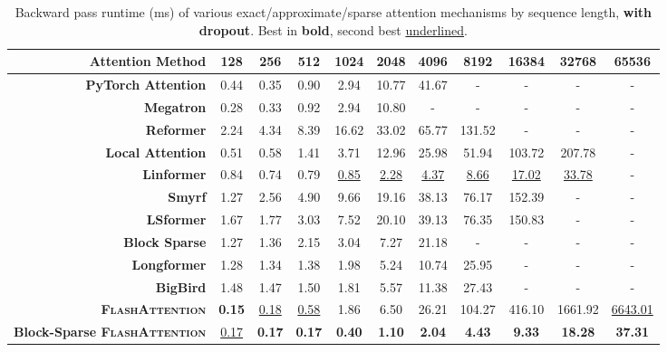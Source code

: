 \documentclass{article}
\newcommand{\sysname}{\textsc{FlashAttention}\xspace}
\begin{document}
\begin{table}
\centering
\scriptsize
\captionsetup{font=small}
\caption{Backward pass runtime (ms) of various exact/approximate/sparse attention mechanisms by sequence length, \textbf{with dropout}. Best in \textbf{bold}, second best \underline{underlined}.}
\begin{tabular}{@{}r|cccccccccc@{}}
\toprule
\textbf{Attention Method} & 128 & 256 & 512 & 1024 & 2048 & 4096 & 8192 & 16384 & 32768 & 65536 \\
\hline
\textbf{PyTorch Attention} & 0.44 & 0.35 & 0.90 & 2.94 & 10.77 & 41.67 & - & - & - & - \\
\textbf{Megatron} & 0.28 & 0.33 & 0.92 & 2.94 & 10.80 & - & - & - & - & - \\
\hline
\textbf{Reformer} & 2.24 & 4.34 & 8.39 & 16.62 & 33.02 & 65.77 & 131.52 & - & - & - \\
\textbf{Local Attention} & 0.51 & 0.58 & 1.41 & 3.71 & 12.96 & 25.98 & 51.94 & 103.72 & 207.78 & - \\
\textbf{Linformer} & 0.84 & 0.74 & 0.79 & \underline{0.85} & \underline{2.28} & \underline{4.37} & \underline{8.66} & \underline{17.02} & \underline{33.78} & - \\
\textbf{Smyrf} & 1.27 & 2.56 & 4.90 & 9.66 & 19.16 & 38.13 & 76.17 & 152.39 & - & - \\
\textbf{LSformer} & 1.67 & 1.77 & 3.03 & 7.52 & 20.10 & 39.13 & 76.35 & 150.83 & - & - \\
\hline
\textbf{Block Sparse} & 1.27 & 1.36 & 2.15 & 3.04 & 7.27 & 21.18 & - & - & - & - \\
\textbf{Longformer} & 1.28 & 1.34 & 1.38 & 1.98 & 5.24 & 10.74 & 25.95 & - & - & - \\
\textbf{BigBird} & 1.48 & 1.47 & 1.50 & 1.81 & 5.57 & 11.38 & 27.43 & - & - & - \\
\hline
\textbf{\sysname} & \textbf{0.15} & \underline{0.18} & \underline{0.58} & 1.86 & 6.50 & 26.21 & 104.27 & 416.10 & 1661.92 & \underline{6643.01} \\
\textbf{Block-Sparse \sysname} & \underline{0.17} & \textbf{0.17} & \textbf{0.17} & \textbf{0.40} & \textbf{1.10} & \textbf{2.04} & \textbf{4.43} & \textbf{9.33} & \textbf{18.28} & \textbf{37.31} \\
\bottomrule
\end{tabular}
\label{tab:dropout_backward_pass}
\end{table}
\end{document}
